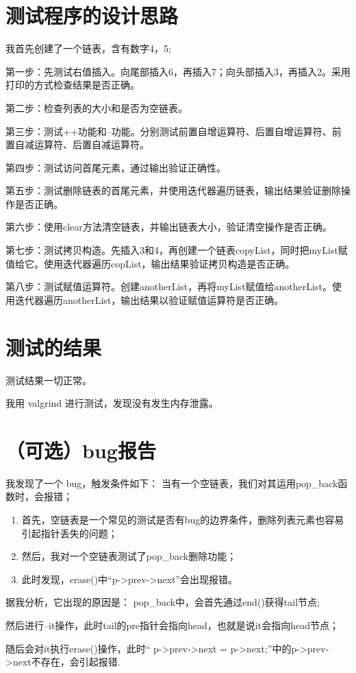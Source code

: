 \documentclass[UTF8]{ctexart}
\begin{document}
\pagestyle{fancy}
\fancyhead{}

\section{测试程序的设计思路}
我首先创建了一个链表，含有数字4，5;  

第一步：先测试右值插入。向尾部插入6，再插入7；向头部插入3，再插入2。采用打印的方式检查结果是否正确。  

第二步：检查列表的大小和是否为空链表。  

第三步：测试++功能和--功能。分别测试前置自增运算符、后置自增运算符、前置自减运算符、后置自减运算符。  

第四步：测试访问首尾元素，通过输出验证正确性。  

第五步：测试删除链表的首尾元素，并使用迭代器遍历链表，输出结果验证删除操作是否正确。  

第六步：使用clear方法清空链表，并输出链表大小，验证清空操作是否正确。  

第七步：测试拷贝构造。先插入3和4，再创建一个链表copyList，同时把myList赋值给它。使用迭代器遍历copList，输出结果验证拷贝构造是否正确。  

第八步：测试赋值运算符。创建anotherList，再将myList赋值给anotherList。使用迭代器遍历anotherList，输出结果以验证赋值运算符是否正确。 

\section{测试的结果}

测试结果一切正常。

我用 valgrind 进行测试，发现没有发生内存泄露。

\section{（可选）bug报告}

我发现了一个 bug，触发条件如下：
当有一个空链表，我们对其运用pop\_back函数时，会报错；

\begin{enumerate}
    \item 首先，空链表是一个常见的测试是否有bug的边界条件，删除列表元素也容易引起指针丢失的问题；
    \item 然后，我对一个空链表测试了pop\_back删除功能；
    \item 此时发现，erase()中“p->prev->next”会出现报错。
    
\end{enumerate}

据我分析，它出现的原因是：
pop\_back中，会首先通过end()获得tail节点;

然后进行--it操作，此时tail的pre指针会指向head，也就是说it会指向head节点；	

随后会对it执行erase()操作，此时“	p->prev->next = p->next;”中的p->prev->next不存在，会引起报错.
\end{document}
